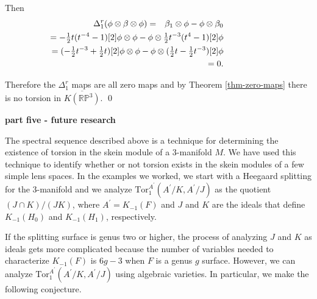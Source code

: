 \documentclass{slides}
\newcommand{\ot}{\otimes}
\newcommand{\LittleOneHalf}{{\textstyle \frac{1}{2}}}
\begin{document}
\begin{slide}
Then
\begin{eqnarray}
\Delta^r_1( \phi \ot \beta \ot \phi ) & = & \beta_1 \ot \phi - \phi \ot \beta_0 \nonumber \\
& & \hspace{-6cm} = -\LittleOneHalf t (t^{-4} - 1)[2] \phi \ot \phi - \phi \ot \LittleOneHalf t^{-3}(t^{4} -1)[2] \phi
\nonumber \\
& & \hspace{-6cm} =  (- \LittleOneHalf t^{-3} + \LittleOneHalf t)[2] \phi \ot \phi - \phi \ot (\LittleOneHalf t
- \LittleOneHalf t^{-3}) [2] \phi \nonumber \\
& & \hspace{-6cm} = 0. \nonumber
\end{eqnarray}

Therefore the $\Delta^r_1$ maps are all zero maps and by
Theorem \ref{thm-zero-maps} there is no torsion in
$\overline{K(\mathbb{RP}^3)}$.
\qed

\end{slide}

\begin{slide}
\textbf{part five - future research}

The spectral sequence described above is a technique
for determining the existence of torsion in the skein module of a $3$-manifold $M$.
We have used this technique to identify whether or not torsion exists
in the skein modules of a few simple lens spaces.
In the examples we worked, we start with a Heegaard splitting for the $3$-manifold and
we analyze
$\mathrm{Tor}_1^{A^{\prime}} ( A^{\prime} / K, A^{\prime} / J )$ as the
quotient $(J \cap K) / (JK)$, where $A^{\prime} = K_{-1}(F)$ and $J$ and $K$
are the ideals that define $K_{-1}(H_0)$ and $K_{-1}(H_1)$, respectively.

If the splitting surface is genus two or higher, the process of
analyzing $J$ and $K$ as ideals gets more complicated because the 
number of variables needed to characterize $K_{-1}(F)$ is
$6 g - 3$ when $F$ is a genus $g$ surface.
However, we can analyze $\mathrm{Tor}_1^{A^{\prime}} ( A^{\prime} / K,
A^{\prime} / J )$ using algebraic varieties.  In particular, we make the following
conjecture.
\end{slide}
\end{document}
